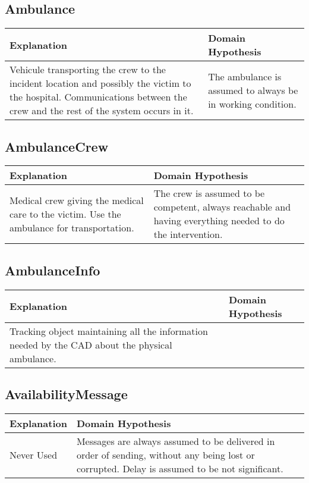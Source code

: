 \subsection{Ambulance}
\begin{tabularx}{\textwidth}{|X|X|} \hline
	Explanation & Domain Hypothesis\\ \hline
	Vehicule transporting the crew to the incident location and possibly the victim to the hospital. 
	Communications between the crew and the rest of the system occurs in it. 
	& The ambulance is assumed to always be in working condition. \\ \hline	
\end{tabularx}

\subsection{\og AmbulanceCrew \fg}

\begin{tabularx}{\textwidth}{|X|X|} \hline
Explanation & Domain Hypothesis\\ \hline
Medical crew giving the medical care to the victim.  Use the ambulance for transportation. & The crew is assumed to be competent, always reachable and having everything needed to do the intervention. \\ \hline
\end{tabularx}


\subsection{AmbulanceInfo}

\begin{tabularx}{\textwidth}{|X|X|} \hline
Explanation & Domain Hypothesis\\ \hline
Tracking object maintaining all the information needed by the CAD about the physical ambulance.
& \\ \hline
\end{tabularx}


\subsection{AvailabilityMessage}

\begin{tabularx}{\textwidth}{|X|X|} \hline
Explanation & Domain Hypothesis\\ \hline
Never Used
&  Messages are always assumed to be delivered in order of sending, without any being lost or corrupted. Delay is assumed to be not significant. \\ \hline
\end{tabularx}


